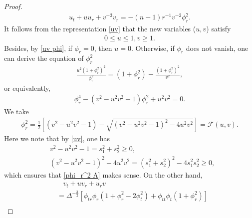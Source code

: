 \documentclass[10pt,leqno]{amsart}
\numberwithin{equation}{section}
\begin{document}
\begin{proof}
\begin{equation*}
		\begin{aligned}
			u_{t} + uu_{r} + v^{-3}v_{r} = -(n-1) r^{-1}  v^{-2} \phi_{r}^{2}.
		\end{aligned}
	\end{equation*}
	It follows from the representation \eqref{uv} that the new variables ($u,v$) satisfy 
	\begin{equation*}
		\begin{aligned}
			0 \leq u \leq 1, v \geq 1.
		\end{aligned}
	\end{equation*}
	Besides, by \eqref{uv phi}, if $ \phi_{r} = 0$, then $u=0$. Otherwise, if $ \phi_{r}$ does not vanish, one can derive the equation of $\phi_{r}^{2}$
	\begin{equation*}
		\begin{aligned}
			\frac{u^{2} (1+\phi_{r}^{2})^{2}}{\phi_{r}^{2}} = (1+\phi_{r}^{2}) - \frac{(1+\phi_{r}^{2})^{2}}{v^{2}},
		\end{aligned}
	\end{equation*}
	or equivalently,
	\begin{equation} \label{F eq}
		\begin{aligned}
			\phi_{r}^{4} - (v^{2}-u^{2}v^{2}-1) \phi_{r}^{2} + u^{2}v^{2}= 0.
		\end{aligned}
	\end{equation}
	We take
	\begin{equation} \label{phi_r^2 A}
		\begin{aligned}
			\phi_{r}^{2}= \frac{1}{2}[ ( v^{2}-u^{2}v^{2}-1 ) - \sqrt{(v^{2}-u^{2}v^{2}-1)^2 -4u^{2}v^{2} }  ] = \mathcal{F}(u,v).
		\end{aligned}
	\end{equation}
	Here we note that by \eqref{uv}, one has
	\begin{equation*} 
		\begin{aligned}
			& v^{2}-u^{2}v^{2}-1=s_{1}^{2}+s_{2}^{2} \geq 0, \\
			&	(v^{2}-u^{2}v^{2}-1)^2 - 4u^{2}v^{2} = (s_{1}^{2}+s_{2}^{2})^2 - 4s_{1}^{2}s_{2}^{2} \geq 0,
		\end{aligned}
	\end{equation*}
	which ensures that \eqref{phi_r^2 A} makes sense. On the other hand,
	\begin{equation*}
		\begin{aligned}
			&\ \ \ \ v_{t} + uv_{r} + u_{r}v  \\
			&= \Delta^{-\frac{3}{2}} [ \phi_{tr} \phi_{r} ( 1+\phi_{r}^{2} - 2 \phi_{t}^{2} ) + \phi_{tt} \phi_{t} (1+\phi_{r}^{2}) ] \\

\end{aligned}
\end{equation*}
\end{proof}
\end{document}
